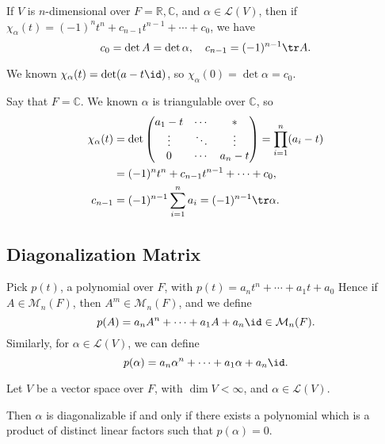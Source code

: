 \documentclass[12pt]{article}
\begin{document}
\begin{lemma}
	If $V$ is $n$-dimensional over $F = \mathbb{R}, \mathbb{C}$, and $\alpha \in \mathcal{L}(V)$, then if $\chi_{\alpha}(t) = (-1)^{n}t^{n} + c_{n-1}t^{n-1} + \cdots + c_0$, we have
	\[
		c_0 = \det A = \det \alpha, \quad c_{n-1} = (-1)^{n-1} \tr A
	.\]
\end{lemma}

\begin{proofbox}
	We known $\chi_{\alpha}(t) = \det(a - t \id)$, so $\chi_{\alpha}(0) = \det \alpha = c_0$.

	Say that $F = \mathbb{C}$. We known $\alpha$ is triangulable over $\mathbb{C}$, so
	\begin{align*}
		\chi_{\alpha}(t) &= \det
		\begin{pmatrix}
			a_1 - t & \cdots & \ast \\
			\vdots & \ddots & \vdots \\
			0 & \cdots & a_n - t
		\end{pmatrix} = \prod_{i = 1}^{n}(a_i - t) \\
				 &= (-1)^{n}t^{n} + c_{n-1}t^{n-1} + \cdots + c_0, \\
		c_{n-1} &= (-1)^{n-1} \sum_{i = 1}^{n} a_i = (-1)^{n-1} \tr \alpha.
	\end{align*}
\end{proofbox}

\subsection{Diagonalization Matrix}%
\label{sub:diagonalization_matrix}

\begin{definition}
	Pick $p(t)$, a polynomial over $F$, with $p(t) = a_n t^{n} + \cdots + a_1 t + a_0$ Hence if $A \in \mathcal{M}_n(F)$, then $A^{m} \in \mathcal{M}_n(F)$, and we define
	\[
		p(A) = a_n A^{n} + \cdots + a_1 A + a_n \id \in \mathcal{M}_n(F)
	.\]
	Similarly, for $\alpha \in \mathcal{L}(V)$, we can define
	\[
		p(\alpha) = a_n \alpha^{n} + \cdots + a_1 \alpha + a_n \id
	.\]
\end{definition}

\begin{theorem}
	Let $V$ be a vector space over $F$, with $\dim V < \infty$, and $\alpha \in \mathcal{L}(V)$.

	Then $\alpha$ is diagonalizable if and only if there exists a polynomial which is a product of distinct linear factors such that $p(\alpha) = 0$.
\end{theorem}
\end{document}
